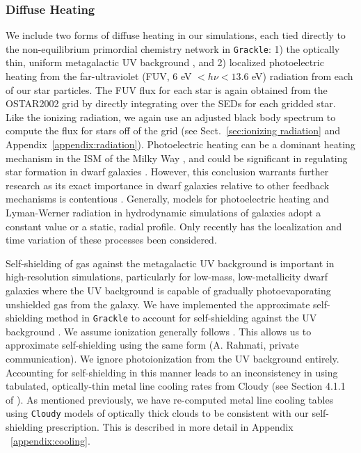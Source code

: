 \documentclass[twocolumn]{aastex61}
\begin{document}
\subsubsection{Diffuse  Heating}
\label{sec:diffusive heating}
We include two forms of diffuse heating in our simulations, each tied directly to the non-equilibrium primordial chemistry network in \texttt{Grackle}: 1) the optically thin, uniform metagalactic UV background \citep{HM2012}, and 2) localized photoelectric heating from the far-ultraviolet (FUV, 6 eV $<h\nu< 13.6$ eV) radiation from each of our star particles. The FUV flux for each star is again obtained from the OSTAR2002 grid by directly integrating over the SEDs for each gridded star. Like the ionizing radiation, we again use an adjusted black body spectrum to compute the flux for stars off of the grid (see Sect.~\ref{sec:ionizing radiation} and Appendix~\ref{appendix:radiation}). Photoelectric heating can be a dominant heating mechanism in the ISM of the Milky Way \citep{Parravano2003}, and could be significant in regulating star formation in dwarf galaxies \citep{Forbes2016}. However, this conclusion warrants further research as its exact importance in dwarf galaxies relative to other feedback mechanisms is contentious \citep{Hu2016,Hu2017}. Generally, models for photoelectric heating and Lyman-Werner radiation in hydrodynamic simulations of galaxies adopt a constant value or a static, radial profile. Only recently has the localization and time variation of these processes been considered.

Self-shielding of gas against the metagalactic UV background is important in high-resolution simulations, particularly for low-mass, low-metallicity dwarf galaxies where the UV background is capable of gradually photoevaporating unshielded gas from the galaxy. We have implemented the \citet{Rahmati2013} approximate self-shielding method in \texttt{Grackle} to account for  self-shielding against the UV background \citep[see][ for more details of this implementation]{GrackleMethod}. We assume  ionization generally follows . This allows us to approximate  self-shielding using the same form (A. Rahmati, private communication). We ignore  photoionization from the UV background entirely. Accounting for self-shielding in this manner leads to an inconsistency in using tabulated, optically-thin metal line cooling rates from Cloudy (see Section 4.1.1 of \citet{Hu2017}). As mentioned previously, we have re-computed metal line cooling tables using \texttt{Cloudy} models of optically thick clouds to be consistent with our self-shielding prescription. This is described in more detail in Appendix ~\ref{appendix:cooling}. 
\end{document}

